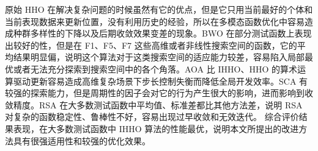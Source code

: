 \documentclass{wzuthesis}
\begin{document}
原始 HHO 在解决复杂问题的时候虽然有它的优点，但是它只用当前最好的个体和当前表现数据来更新位置，没有利用历史的经验，所以在多模态函数优化中容易造成种群多样性的下降以及后期收敛效果变差的现象。BWO 在部分测试函数上表现出较好的性，但是在 F1、F5、F7 这些高维或者非线性搜索空间的函数，它的平均结果明显偏，说明这个算法对于这类搜索空间的适应能力较差，容易陷入局部最优或者无法充分探索到搜索空间中的各个角落。AOA 比 IHHO、HHO 的算术运算驱动更新容易造成高维复杂场景下步长控制失衡而降低全局开发效率。SCA 有较强的探索能力，但是周期性的因子会对它的行为产生很大的影响，进而影响到收敛精度。RSA 在大多数测试函数中平均值、标准差都比其他方法差，说明 RSA 对复杂的函数稳定性、鲁棒性不好，容易出现过早收敛和无效迭代。
综合评价结果表现，在大多数测试函数中 IHHO 算法的性能最优，说明本文所提出的改进方法具有很强适用性和较强的优化效果。
\end{document}
